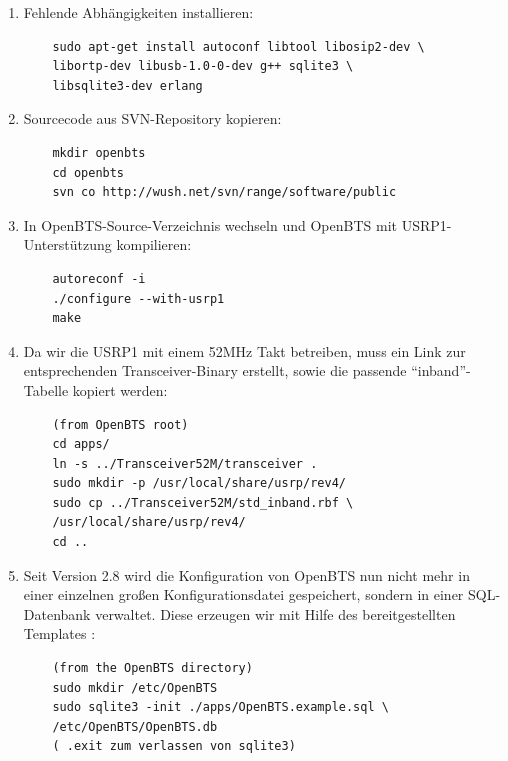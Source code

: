 \begin{enumerate}
	\item Fehlende Abhängigkeiten installieren:
	\begin{verbatim}
	sudo apt-get install autoconf libtool libosip2-dev \
	libortp-dev libusb-1.0-0-dev g++ sqlite3 \
	libsqlite3-dev erlang
	\end{verbatim}
	\item Sourcecode aus SVN-Repository kopieren:
	\begin{verbatim}
	mkdir openbts
	cd openbts
	svn co http://wush.net/svn/range/software/public
	\end{verbatim}
	\item In OpenBTS-Source-Verzeichnis wechseln und OpenBTS mit USRP1-Unterstützung kompilieren:
	\begin{verbatim}
	autoreconf -i
	./configure --with-usrp1
	make
	\end{verbatim}
	\item Da wir die USRP1 mit einem 52MHz Takt betreiben, muss ein Link zur entsprechenden Transceiver-Binary erstellt, sowie die passende "`inband"'-Tabelle kopiert werden:
	\begin{verbatim}
	(from OpenBTS root)
	cd apps/
	ln -s ../Transceiver52M/transceiver .
	sudo mkdir -p /usr/local/share/usrp/rev4/
	sudo cp ../Transceiver52M/std_inband.rbf \
	/usr/local/share/usrp/rev4/
	cd ..
	\end{verbatim}
	\item Seit Version 2.8 wird die Konfiguration von OpenBTS nun nicht mehr in einer einzelnen großen Konfigurationsdatei gespeichert, sondern in einer SQL-Datenbank verwaltet. Diese erzeugen wir mit Hilfe des bereitgestellten Templates :
	\begin{verbatim}
	(from the OpenBTS directory)
	sudo mkdir /etc/OpenBTS
	sudo sqlite3 -init ./apps/OpenBTS.example.sql \
	/etc/OpenBTS/OpenBTS.db
	( .exit zum verlassen von sqlite3)
	\end{verbatim}
\end{enumerate}

